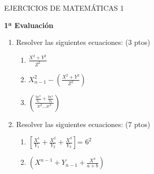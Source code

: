 \documentclass[10pt,a4paper]{article}
\begin{document}
\begin{center}
\LARGE \textcolor[rgb]{1,0,0}{EJERCICIOS DE MATEMÁTICAS 1}
\end{center}
\bigskip
\begin{center}
\Large \bf1ª Evaluación
\end{center}
\begin{flushleft}
\begin{enumerate}
\item \large Resolver las siguientes ecuaciones: \textcolor[rgb]{0,0,1}{(3 ptos)}
	\begin{enumerate}
	\item \large $\frac{X^2+Y^2}{Z^2}$
	\item \large $X^2_{n-1} - \left(\frac{X^2+Y^2}{Z^2}\right)$
	\item \large $\left(\frac{\frac{bx^3}{b_1}+\frac{bx^4}{b_2}}{x^2...x^3}		 \right)$
	\end{enumerate}
\item \large Resolver las siguientes ecuaciones: \textcolor[rgb]{0,0,1}{(7 ptos)}
	\begin{enumerate}
	\item $\left[\frac{X^1}{Y_1}+\frac{X^2}{Y_2}+\frac{X^3}{Y_3}\right]$= $6^2$
	\item $\left(X^{n-1}+Y_{n-1}+\frac{X^4}{a+b}\right)$
	\end{enumerate}
\end{enumerate}
\end{flushleft}
\end{document}
